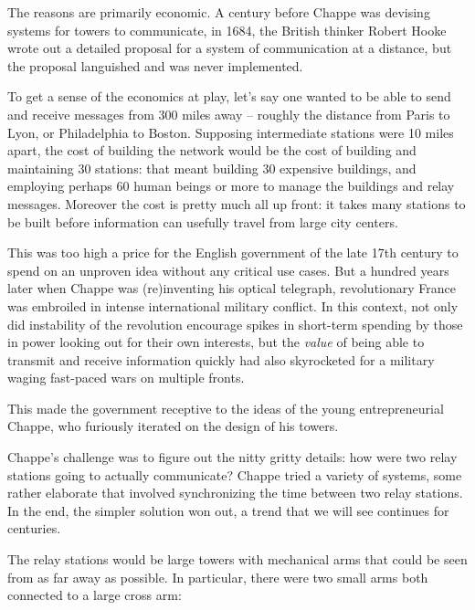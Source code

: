 \documentclass[UTF8]{book}
\begin{document}
\begin{CJK}{UTF8}{gbsn}
The reasons are primarily economic. A century before Chappe was devising systems for towers to communicate, in 1684, the British thinker Robert Hooke wrote out a detailed proposal for a system of communication at a distance, but the proposal languished and was never implemented.

To get a sense of the economics at play, let's say one wanted to be able to send and receive messages from 300 miles away – roughly the distance from Paris to Lyon, or Philadelphia to Boston. Supposing intermediate stations were 10 miles apart, the cost of building the network would be the cost of building and maintaining 30 stations: that meant building 30 expensive buildings, and employing perhaps 60 human beings or more to manage the buildings and relay messages. Moreover the cost is pretty much all up front: it takes many stations to be built before information can usefully travel from large city centers.

This was too high a price for the English government of the late 17th century to spend on an unproven idea without any critical use cases. But a hundred years later when Chappe was (re)inventing his optical telegraph, revolutionary France was embroiled in intense international military conflict. In this context, not only did instability of the revolution encourage spikes in short-term spending by those in power looking out for their own interests, but the \emph{value} of being able to transmit and receive information quickly had also skyrocketed for a military waging fast-paced wars on multiple fronts.

This made the government receptive to the ideas of the young entrepreneurial Chappe, who furiously iterated on the design of his towers.

Chappe's challenge was to figure out the nitty gritty details: how were two relay stations going to actually communicate? Chappe tried a variety of systems, some rather elaborate that involved synchronizing the time between two relay stations. In the end, the simpler solution won out, a trend that we will see continues for centuries.

The relay stations would be large towers with mechanical arms that could be seen from as far away as possible. In particular, there were two small arms both connected to a large cross arm:


\end{CJK}
\end{document}
